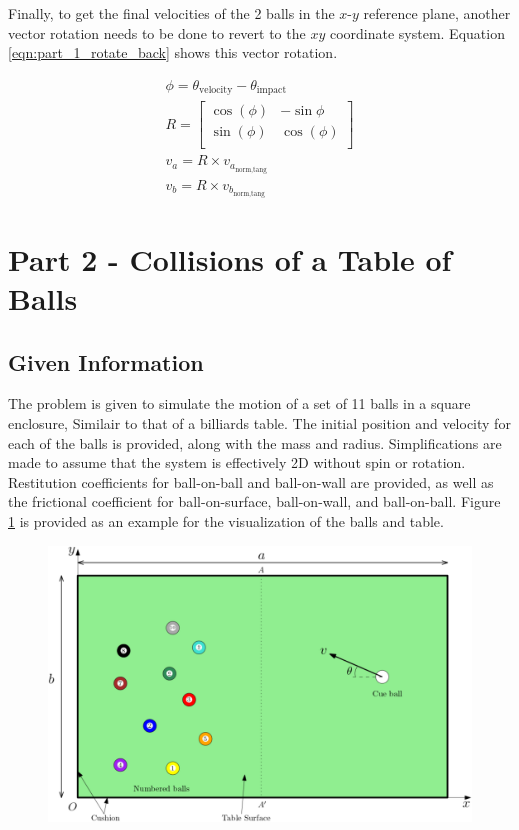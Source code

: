 \documentclass[12pt]{article}
\begin{document}
Finally, to get the final velocities of the 2 balls in the $x$-$y$ reference plane, another vector rotation needs to be done to revert to the $xy$ coordinate system. Equation \ref{eqn:part_1_rotate_back} shows this vector rotation.

\begin{equation}
    \label{eqn:part_1_rotate_back}
    \begin{gathered}
        \phi = \theta_\text{velocity} - \theta_\text{impact}\\
        R = 
        \left[
        \begin{matrix}
            \cos(\phi) & -\sin{\phi}\\
            \sin(\phi) & \cos(\phi)\\
        \end{matrix}
        \right]\\
        v_a = R \times v_{a_\text{norm,tang}} \\
        v_b = R \times v_{b_\text{norm,tang}}
    \end{gathered}
\end{equation}


\section{Part 2 - Collisions of a Table of Balls}
\subsection{Given Information}\label{Pt2_Given}
The problem is given to simulate the motion of a set of 11 balls in a square enclosure, Similair to that of a billiards table. The initial position and velocity for each of the balls is provided, along with the mass and radius. Simplifications are made to assume that the system is effectively 2D without spin or rotation. Restitution coefficients for ball-on-ball and ball-on-wall are provided, as well as the frictional coefficient for ball-on-surface, ball-on-wall, and ball-on-ball. Figure \ref{P2_diag} is provided as an example for the visualization of the balls and table.

\begin{figure}[H]
    \centering
    \includegraphics[width=12cm]{resources/Part_2_layout.png}
    \label{P2_diag}
\end{figure}
\end{document}
